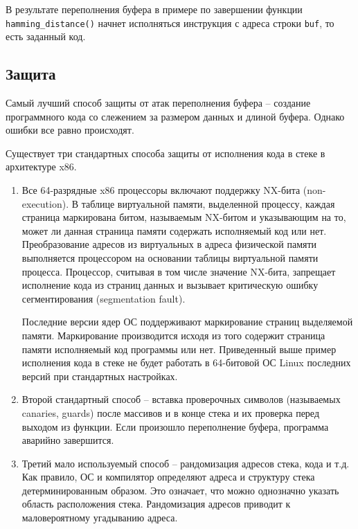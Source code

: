В результате переполнения буфера в примере по завершении функции \texttt{hamming\_distance()} начнет исполняться инструкция с адреса строки \texttt{buf}, то есть заданный код.


\subsection{Защита}

Самый лучший способ защиты от атак переполнения буфера -- создание программного кода со слежением за размером данных и длиной буфера. Однако ошибки все равно происходят.

Существует три стандартных способа защиты от исполнения кода в стеке в архитектуре x86.

\begin{enumerate}
    \item Все 64-разрядные x86 процессоры включают поддержку NX-бита (non-execution). В таблице виртуальной памяти, выделенной процессу, каждая страница маркирована битом, называемым NX-битом и указывающим на то, может ли данная страница памяти содержать исполняемый код или нет. Преобразование адресов из виртуальных в адреса физической памяти выполняется процессором на основании таблицы виртуальной памяти процесса. Процессор, считывая в том числе значение NX-бита, запрещает исполнение кода из страниц данных и вызывает критическую ошибку сегментирования (segmentation fault).

        Последние версии ядер ОС поддерживают маркирование страниц выделяемой памяти. Маркирование производится исходя из того содержит страница памяти исполняемый код программы или нет. Приведенный выше пример исполнения кода в стеке не будет работать в 64-битовой ОС Linux последних версий при стандартных настройках.

    \item Второй стандартный способ -- вставка проверочных символов (называемых canaries, guards) после массивов и в конце стека и их проверка перед выходом из функции. Если произошло переполнение буфера, программа аварийно завершится.

    \item Третий мало используемый способ -- рандомизация адресов стека, кода и т.д. Как правило, ОС и компилятор определяют адреса и структуру стека детерминированным образом. Это означает, что можно однозначно указать область расположения стека. Рандомизация адресов приводит к маловероятному угадыванию адреса.
\end{enumerate}


